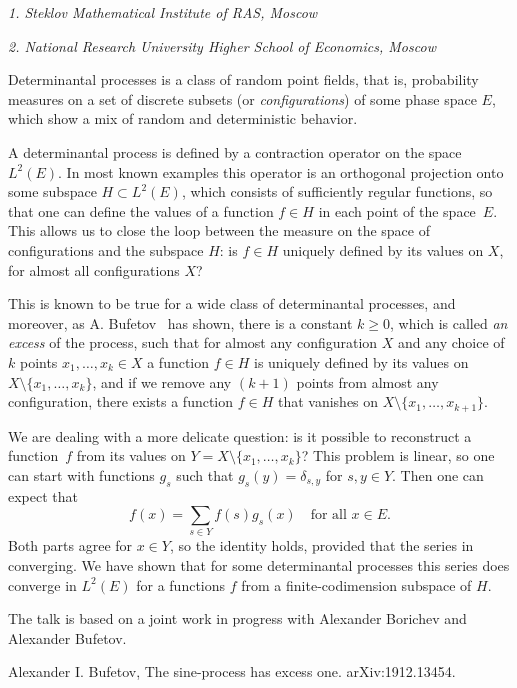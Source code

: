 

\begin{center}
	\maketitle
	{\large\textit{1. Steklov Mathematical Institute of RAS, Moscow}}
	
	{\large\textit{2. National Research University Higher School of Economics, Moscow}}
\end{center}

Determinantal processes is a class of random point fields, that is,  probability measures on a set of discrete subsets (or \emph{configurations}) of some phase space $E$, which show a mix of random and deterministic behavior.

A determinantal process is defined by a contraction operator on the space $L^2(E)$.
In most known examples this operator is an orthogonal projection onto some subspace $H\subset L^2(E)$, which consists of sufficiently regular functions, so that one can define the values of a function $f\in H$ in each point of the space~$E$. 
This allows us to close the loop between the measure on the space of configurations and the subspace $H$: is $f\in H$ uniquely defined by its values on $X$, for almost all configurations $X$?
 
This is known to be true for a wide class of determinantal processes, and moreover, as A. Bufetov~\cite{Bufetov-Sine} has shown, there is a constant $k\ge 0$, which is called \emph{an excess} of the process, such that for almost any configuration $X$ and any choice of $k$ points $x_1,\dots,x_k\in X$ a function $f\in H$ is uniquely defined by its values on $X\setminus\{x_1,\dots,x_k\}$, and if we remove any $(k+1)$ points from almost any configuration, there exists a function $f\in H$ that vanishes on $X\setminus\{x_1,\dots,x_{k+1}\}$.

We are dealing with a more delicate question: is it possible to reconstruct a function~$f$ from its values on $Y=X\setminus\{x_1,\dots,x_k\}$? This problem is linear, so one can start with functions $g_s$ such that $g_s(y)=\delta_{s,y}$ for $s,y\in Y$.
Then one can expect that
$$
	f(x)=\sum_{s\in Y} f(s)g_s(x)\quad\mbox{for all }x\in E.
$$
Both parts agree for $x\in Y$, so the identity holds, provided that the series in converging. We have shown that for some determinantal processes this series does converge in $L^2(E)$ for a functions $f$ from a finite-codimension subspace of $H$.

The talk is based on a joint work in progress with Alexander Borichev and Alexander Bufetov.



\begin{thebibliography}{99}
	Alexander I. Bufetov, The sine-process has excess one.  	arXiv:1912.13454.
	
\end{thebibliography}



